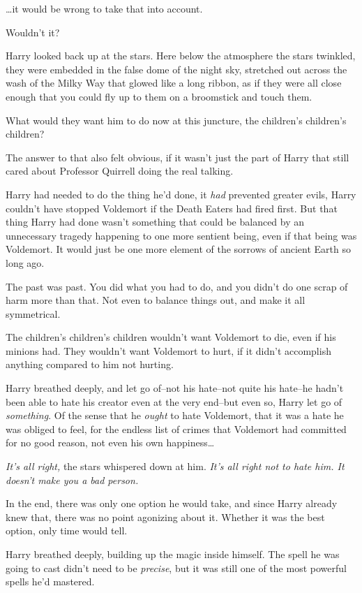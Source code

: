{\ldots}it would be wrong to take that into account.

Wouldn't it?

Harry looked back up at the stars. Here below the atmosphere the stars twinkled, they were embedded in the false dome of the night sky, stretched out across the wash of the Milky Way that glowed like a long ribbon, as if they were all close enough that you could fly up to them on a broomstick and touch them.

What would they want him to do now at this juncture, the children's children's children?

The answer to that also felt obvious, if it wasn't just the part of Harry that still cared about Professor Quirrell doing the real talking.

Harry had needed to do the thing he'd done, it \emph{had} prevented greater evils, Harry couldn't have stopped Voldemort if the Death Eaters had fired first. But that thing Harry had done wasn't something that could be balanced by an unnecessary tragedy happening to one more sentient being, even if that being was Voldemort. It would just be one more element of the sorrows of ancient Earth so long ago.

The past was past. You did what you had to do, and you didn't do one scrap of harm more than that. Not even to balance things out, and make it all symmetrical.

The children's children's children wouldn't want Voldemort to die, even if his minions had. They wouldn't want Voldemort to hurt, if it didn't accomplish anything compared to him not hurting.

Harry breathed deeply, and let go of\---not his hate\---not quite his hate\---he hadn't been able to hate his creator even at the very end\---but even so, Harry let go of \emph{something}. Of the sense that he \emph{ought} to hate Voldemort, that it was a hate he was obliged to feel, for the endless list of crimes that Voldemort had committed for no good reason, not even his own happiness{\ldots}

\emph{It's all right,} the stars whispered down at him. \emph{It's all right not to hate him. It doesn't make you a bad person.}

In the end, there was only one option he would take, and since Harry already knew that, there was no point agonizing about it. Whether it was the best option, only time would tell.

Harry breathed deeply, building up the magic inside himself. The spell he was going to cast didn't need to be \emph{precise}, but it was still one of the most powerful spells he'd mastered.

